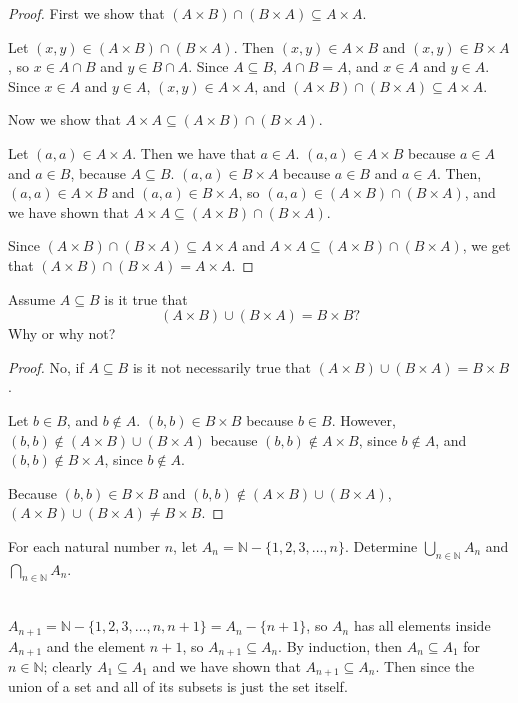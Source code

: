 \documentclass[12 pt]{exam}
\begin{document}
\begin{questions}
\begin{solution}
\begin{proof}
First we show that $(A \times B) \cap (B \times A) \subseteq A \times A$.

Let $(x, y) \in (A \times B) \cap (B \times A)$. Then $(x, y) \in A \times B$ and $(x, y) \in B \times A$, so $x \in A \cap B$ and $y \in B \cap A$. Since $A \subseteq B$, $A \cap B = A$, and $x \in A$ and $y \in A$. Since $x \in A$ and $y \in A$, $(x, y) \in A \times A$, and $(A \times B) \cap (B \times A) \subseteq A \times A$.

Now we show that $A \times A \subseteq (A \times B) \cap (B \times A)$.

Let $(a, a) \in A \times A$. Then we have that $a \in A$. $(a, a) \in A \times B$ because $a \in A$ and $a \in B$, because $A \subseteq B$. $(a, a) \in B \times A$ because $a \in B$ and $a \in A$. Then, $(a, a) \in A \times B$ and $(a, a) \in B \times A$, so $(a, a) \in (A \times B) \cap (B \times A)$, and we have shown that $A \times A \subseteq (A \times B) \cap (B \times A)$.

Since $(A \times B) \cap (B \times A) \subseteq A \times A$ and $A \times A \subseteq (A \times B) \cap (B \times A)$, we get that $(A \times B) \cap (B \times A) = A \times A$.
\end{proof}\end{solution}

\question Assume $A \subseteq B$ is it true that $$(A \times B) \cup (B \times A)=B \times B?$$ Why or why not?
\begin{solution}\begin{proof}
No, if $A \subseteq B$ is it not necessarily true that $(A \times B) \cup (B \times A) = B \times B$.

Let $b \in B$, and $b \notin A$. $(b, b) \in B \times B$ because $b \in B$. However, $(b, b) \notin (A \times B) \cup (B \times A)$ because $(b, b) \notin A \times B$, since $b \notin A$, and $(b, b) \notin B \times A$, since $b \notin A$.

Because $(b, b) \in B \times B$ and $(b, b) \notin (A \times B) \cup (B \times A)$, $(A \times B) \cup (B \times A) \neq B \times B$.
\end{proof}\end{solution}
	
\question For each natural number $n$, let $A_n=\mathbb{N} - \{ 1,2,3, \ldots, n\}$. Determine $\bigcup_{n\in\mathbb{N} }A_n$ and $\bigcap_{n\in\mathbb{N}} A_n$.
\begin{solution} \\
$A_{n+1} = \mathbb{N} - \{1, 2, 3, \ldots, n, n+1\} = A_n - \{n+1\}$, so $A_n$ has all elements inside $A_{n+1}$ and the element $n+1$, so $A_{n+1} \subseteq A_n$. By induction, then $A_n \subseteq A_1$ for $n \in \mathbb{N}$; clearly $A_1 \subseteq A_1$ and we have shown that $A_{n+1} \subseteq A_n$. Then  since the union of a set and all of its subsets is just the set itself. \\


\end{solution}
\end{questions}
\end{document}
